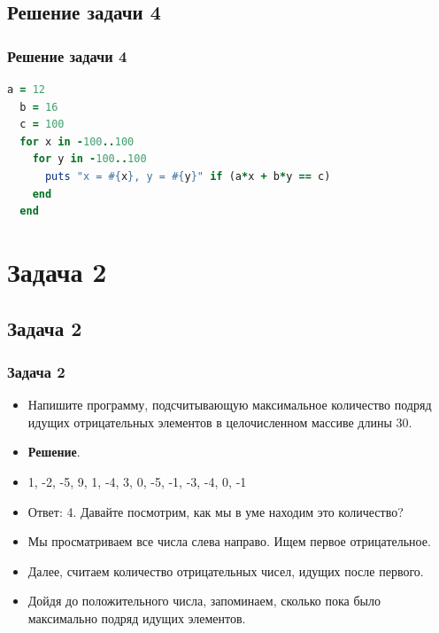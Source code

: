 \documentclass[compress,red]{beamer}
\begin{document}
\subsection{Решение задачи 4}
\begin{frame}[fragile]
  \frametitle{Решение задачи 4}
  \scriptsize{
  \begin{lstlisting}[language=ruby,basicstyle=\footnotesize,label=ruby2,caption=Задача 4]
  a = 12
  b = 16
  c = 100
  for x in -100..100
    for y in -100..100
      puts "x = #{x}, y = #{y}" if (a*x + b*y == c)
    end
  end
  \end{lstlisting}
  }
  
\end{frame}

\section{Задача 2}
\subsection{Задача 2}
\begin{frame}[fragile]
  \frametitle{Задача 2}
  \begin{itemize}
    \item Напишите программу, подсчитывающую максимальное количество подряд идущих отрицательных элементов в целочисленном массиве длины 30.
    \item \textbf{Решение}.
    \item 1, -2, -5, 9, 1, -4, 3, 0, -5, -1, -3, -4, 0, -1
    \item Ответ: 4. Давайте посмотрим, как мы в уме находим это количество?
    \item Мы просматриваем все числа слева направо. Ищем первое отрицательное.
    \item Далее, считаем количество отрицательных чисел, идущих после первого.
    \item Дойдя до положительного числа, запоминаем, сколько пока было максимально подряд идущих элементов.
  \end{itemize}
\end{frame}
\end{document}
